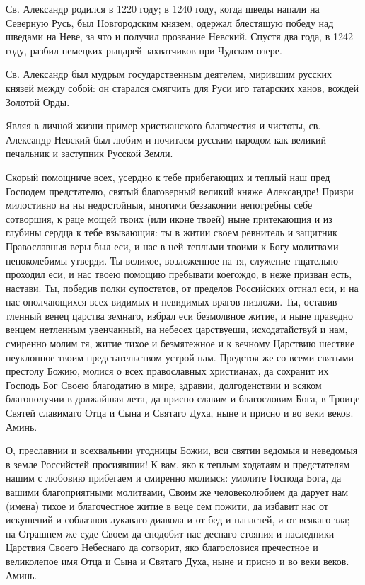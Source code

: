  

Св. Александр родился в 1220 году; в 1240 году, когда шведы напали на Северную Русь, был Новгородским князем; одержал блестящую победу над шведами на Неве, за что и получил прозвание Невский. Спустя два года, в 1242 году, разбил немецких рыцарей-захватчиков при Чудском озере. 

Св. Александр был мудрым государственным деятелем, мирившим русских князей между собой: он старался смягчить для Руси иго татарских ханов, вождей Золотой Орды. 

Являя в личной жизни пример христианского благочестия и чистоты, св. Александр Невский был любим и почитаем русским народом как великий печальник и заступник Русской Земли.



Скорый помощниче всех, усердно к тебе прибегающих и теплый наш пред Господем предстателю, святый благоверный великий княже Александре! Призри милостивно на ны недостойныя, многими беззаконии непотребны себе сотворшия, к раце мощей твоих (или иконе твоей) ныне притекающия и из глубины сердца к тебе взывающия: ты в житии своем ревнитель и защитник Православныя веры был еси, и нас в ней теплыми твоими к Богу молитвами непоколебимы утверди. Ты великое, возложенное на тя, служение тщательно проходил еси, и нас твоею помощию пребывати коегождо, в неже призван есть, настави. Ты, победив полки супостатов, от пределов Российских отгнал еси, и на нас ополчающихся всех видимых и невидимых врагов низложи. Ты, оставив тленный венец царства земнаго, избрал еси безмолвное житие, и ныне праведно венцем нетленным увенчанный, на небесех царствуеши, исходатайствуй и нам, смиренно молим тя, житие тихое и безмятежное и к вечному Царствию шествие неуклонное твоим предстательством устрой нам. Предстоя же со всеми святыми престолу Божию, молися о всех православных христианах, да сохранит их Господь Бог Своею благодатию в мире, здравии, долгоденствии и всяком благополучии в должайшая лета, да присно славим и благословим Бога, в Троице Святей славимаго Отца и Сына и Святаго Духа, ныне и присно и во веки веков. Аминь.\longpage[2]{}\mychapterending

 


О, преславнии и всехвальнии угодницы Божии, вси святии ведомыя и неведомыя в земле Российстей просиявшии! К вам, яко к теплым ходатаям и предстателям нашим с любовию прибегаем и смиренно молимся: умолите Господа Бога, да вашими благоприятными молитвами, Своим же человеколюбием да дарует нам (имена) тихое и благочестное житие в веце сем пожити, да избавит нас от искушений и соблазнов лукаваго диавола и от бед и напастей, и от всякаго зла; на Страшнем же суде Своем да сподобит нас деснаго стояния и наследники Царствия Своего Небеснаго да сотворит, яко благословися пречестное и великолепое имя Отца и Сына и Святаго Духа, ныне и присно и во веки веков. Аминь.
\mychapterending

